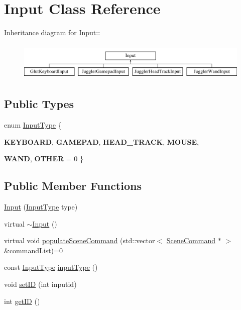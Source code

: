 \hypertarget{class_input}{
\section{Input Class Reference}
\label{class_input}
}
Inheritance diagram for Input::\begin{figure}[H]
\begin{center}
\leavevmode
\includegraphics[height=1.84211cm]{class_input}
\end{center}
\end{figure}
\subsection*{Public Types}
\begin{DoxyCompactItemize}
\item 
enum \hyperlink{class_input_a5b3edc71e8f4aec47e2f44a492297cab}{InputType} \{ \par
{\bfseries KEYBOARD}, 
{\bfseries GAMEPAD}, 
{\bfseries HEAD\_\-TRACK}, 
{\bfseries MOUSE}, 
\par
{\bfseries WAND}, 
{\bfseries OTHER} =  0
 \}
\end{DoxyCompactItemize}
\subsection*{Public Member Functions}
\begin{DoxyCompactItemize}
\item 
\hyperlink{class_input_a7bdc5c67dff8a595f91ccb10da4cc4c2}{Input} (\hyperlink{class_input_a5b3edc71e8f4aec47e2f44a492297cab}{InputType} type)
\item 
virtual \hyperlink{class_input_a230646fa6e6433b4d9ac3535b7d52087}{$\sim$Input} ()
\item 
virtual void \hyperlink{class_input_ab927e3b2f1735052f6f1ef3f3bf7b29c}{populateSceneCommand} (std::vector$<$ \hyperlink{class_scene_command}{SceneCommand} $\ast$ $>$ \&commandList)=0
\item 
const \hyperlink{class_input_a5b3edc71e8f4aec47e2f44a492297cab}{InputType} \hyperlink{class_input_a50aabbed0136edcf6c3eae963e2d9a55}{inputType} ()
\item 
void \hyperlink{class_input_aa1402943d600a2a5d9238204803c0eda}{setID} (int inputid)
\item 
int \hyperlink{class_input_a64afe40706be8b09168100a7aeee26e2}{getID} ()
\end{DoxyCompactItemize}
